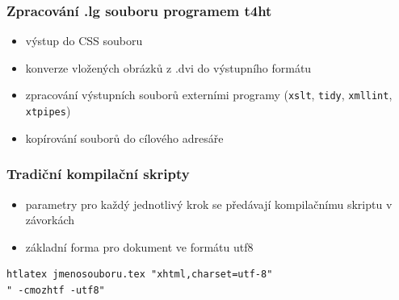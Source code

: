 \begin{frame}
  \frametitle{Zpracování .lg souboru programem t4ht}
  \begin{itemize}
    \item   výstup do CSS souboru
    \item   konverze vložených obrázků z .dvi do výstupního formátu
    \item   zpracování výstupních souborů externími programy 
    (\texttt{xslt}, \texttt{tidy}, \texttt{xmllint}, \texttt{xtpipes})
    \item   kopírování souborů do cílového adresáře
  \end{itemize}
\end{frame}

\begin{frame}[fragile]
  \frametitle{Tradiční kompilační skripty}
  \begin{itemize}
    \item parametry pro každý jednotlivý krok se předávají kompilačnímu skriptu v závorkách
    \item základní forma pro dokument ve formátu utf8
  \end{itemize}
      \begin{priklad}
        \small 
\begin{verbatim}
htlatex jmenosouboru.tex "xhtml,charset=utf-8" 
" -cmozhtf -utf8"
\end{verbatim}
     \end{priklad}
\end{frame}

